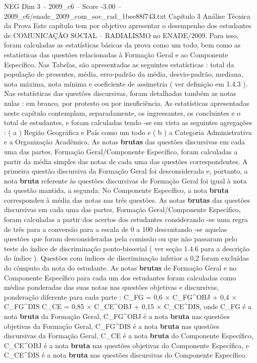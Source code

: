\begin{textsample}{NEG Dim 3 – 2009\_c6 – Score -3.00 – 2009\_c6/enade\_2009\_com\_soc\_rad\_1bee88f743.txt}  \label{ex:f3_neg_043}
Capítulo 3 Análise Técnica da Prova Este capítulo tem por objetivo apresentar o desempenho dos estudantes de COMUNICAÇÃO SOCIAL – RADIALISMO no ENADE/2009.
Para isso, foram calculadas as estatísticas básicas da prova como um todo, bem como as estatísticas das questões relacionadas à Formação Geral e ao Componente Específico.
Nas Tabelas, são apresentadas as seguintes estatísticas : total da população de presentes, média, erro-padrão da média, desvio-padrão, mediana, nota máxima, nota mínima e coeficiente de assimetria ( ver definição em 1.4.3 ).
Nas estatísticas das questões discursivas, foram detalhadas também as notas nulas : em branco, por protesto ou por insuficiência.
As estatísticas apresentadas neste capítulo contemplam, separadamente, os ingressantes, os concluintes e o total de estudantes, e foram calculadas tendo -se em vista as seguintes agregações : ( a ) Região Geográfica e País como um todo e ( b ) a Categoria Administrativa e a Organização Acadêmica.
As notas \textbf{brutas} das questões discursivas em cada uma das partes, Formação Geral/Componente Específico, foram calculadas a partir da média simples das notas de cada uma das questões correspondentes.
A primeira questão discursiva da Formação Geral foi desconsiderada e, portanto, a nota \textbf{bruta} referente às questões discursivas de Formação Geral foi igual à nota da questão mantida, a segunda.
No Componente Específico, a nota \textbf{bruta} correspondeu à média das notas nas três questões.
As notas \textbf{brutas} das questões discursivas em cada uma das partes, Formação Geral/Componente Específico, foram calculadas a partir dos acertos dos estudantes considerando -se uma regra de três para a conversão para a escala de 0 a 100 descontando -se aquelas questões que foram desconsideradas pela comissão ou que não passaram pelo teste do índice de discriminação ponto-bisserial ( ver seção 1.4.6 para a descrição do índice ).
Questões com índices de discriminação inferior a 0,2 foram excluídas do cômputo da nota do estudante.
As notas \textbf{brutas} de Formação Geral e no Componente Específico para cada um dos estudantes foram calculadas como médias ponderadas das suas notas nas questões objetivas e discursivas, ponderação diferente para cada parte : C\_FG = 0,6 × C\_FG\textasciicircum{}OBJ + 0,4 × C\_FG\textasciicircum{}DIS C\_CE = 0,85 × C\_CE\textasciicircum{}OBJ + 0,15 × C\_CE\textasciicircum{}DIS, onde C\_FG é a nota \textbf{bruta} da Formação Geral, C\_FG\textasciicircum{}OBJ é a nota \textbf{bruta} nas questões objetivas da Formação Geral, C\_FG\textasciicircum{}DIS é a nota \textbf{bruta} nas questões discursivas da Formação Geral, C\_CE é a nota \textbf{bruta} do Componente Específico, C\_CE\textasciicircum{}OBJ é a nota \textbf{bruta} nas questões objetivas do Componente Específica, e C\_CE\textasciicircum{}DIS é a nota \textbf{bruta} nas questões discursivas do Componente Específico.

\end{textsample}
